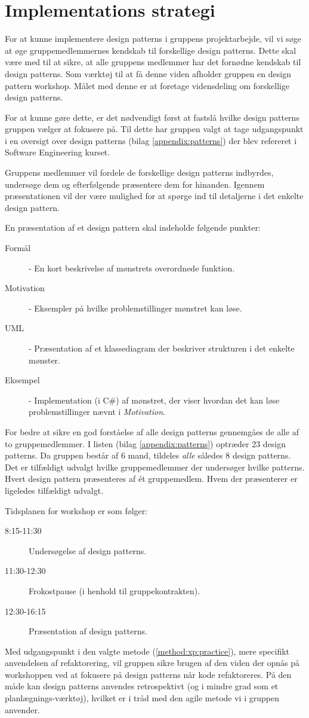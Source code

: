\section{Implementations strategi}
For at kunne implementere design patterns i gruppens projektarbejde, vil vi søge at øge gruppemedlemmernes kendskab til forskellige design patterns.
Dette skal være med til at sikre, at alle gruppens medlemmer har det fornødne kendskab til design patterns.
Som værktøj til at få denne viden afholder gruppen en design pattern workshop.
Målet med denne er at foretage vidensdeling om forskellige design patterns.

For at kunne gøre dette, er det nødvendigt først at fastslå hvilke design patterns gruppen vælger at fokusere på.
Til dette har gruppen valgt at tage udgangspunkt i en oversigt over design patterns (bilag \ref{appendix:patterns}) der blev refereret i Software Engineering kurset.

Gruppens medlemmer vil fordele de forskellige design patterns indbyrdes, undersøge dem og efterfølgende præsentere dem for hinanden.
Igennem præsentationen vil der være mulighed for at spørge ind til detaljerne i det enkelte design pattern.

En præsentation af et design pattern skal indeholde følgende punkter:
\begin{description}
\item[Formål] - En kort beskrivelse af mønstrets overordnede funktion.
\item[Motivation] - Eksempler på hvilke problemstillinger mønstret kan løse.
\item[UML] - Præsentation af et klassediagram der beskriver strukturen i det enkelte mønster.
\item[Eksempel] - Implementation (i C\#) af mønstret, der viser hvordan det kan løse problemstillinger nævnt i \emph{Motivation}.
\end{description}

For bedre at sikre en god forståelse af alle design patterns gennemgåes de alle af to gruppemedlemmer.
I listen (bilag \ref{appendix:patterns}) optræder 23 design patterns.
Da gruppen består af 6 mand, tildeles \textit{alle} således 8 design patterns.
Det er tilfældigt udvalgt hvilke gruppemedlemmer der undersøger hvilke patterns.
Hvert design pattern præsenteres af \'et gruppemedlem.
Hvem der præsenterer er ligeledes tilfældigt udvalgt.

Tidsplanen for workshop er som følger:
\begin{description}
\item [8:15-11:30] Undersøgelse af design patterns.
\item [11:30-12:30] Frokostpause (i henhold til gruppekontrakten).
\item [12:30-16:15] Præsentation af design patterns.
\end{description}

Med udgangspunkt i den valgte metode (\cref{method:xp:practice}), mere specifikt anvendelsen af refaktorering, vil gruppen sikre brugen af den viden der opnås på workshoppen ved at fokusere på design patterns når kode refaktoreres.
På den måde kan design patterns anvendes retrospektivt (og i mindre grad som et planlægnings-værktøj), hvilket er i tråd med den agile metode vi i gruppen anvender.